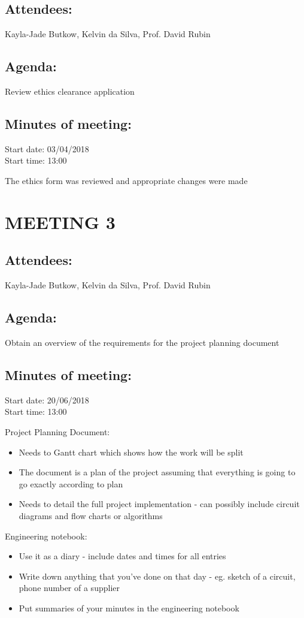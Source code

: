 \documentclass[10pt,onecolumn]{witseiepaper}
\begin{document}
\subsection*{Attendees:}
Kayla-Jade Butkow, Kelvin da Silva, Prof. David Rubin
\subsection*{Agenda:} 
Review ethics clearance application

\subsection*{Minutes of meeting:}
Start date: 03/04/2018 \\
Start time: 13:00

The ethics form was reviewed and appropriate changes were made

\section*{MEETING 3}
\subsection*{Attendees:}
Kayla-Jade Butkow, Kelvin da Silva, Prof. David Rubin
\subsection*{Agenda:} 
Obtain an overview of the requirements for the project planning document

\subsection*{Minutes of meeting:}
Start date: 20/06/2018 \\
Start time: 13:00

Project Planning Document:
\begin{itemize}
	\item Needs to Gantt chart which shows how the work will be split
	\item The document is a plan of the project assuming that everything is going to go exactly according to plan 
	\item Needs to detail the full project implementation - can possibly include circuit diagrams and flow charts or algorithms
\end{itemize}

Engineering notebook:
\begin{itemize}
	\item Use it as a diary - include dates and times for all entries
	\item Write down anything that you've done on that day - eg. sketch of a circuit, phone number of a supplier
	\item Put summaries of your minutes in the engineering notebook
\end{itemize}
\end{document}
